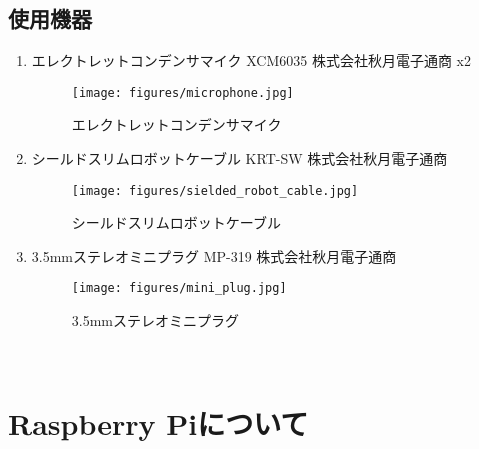 \subsection{使用機器}\label{used-equipments-mic}
  \begin{enumerate}
  \renewcommand{\labelenumi}{(\arabic{enumi})}
  \item
    エレクトレットコンデンサマイク XCM6035 株式会社秋月電子通商
    \cite{XCM6035:online} x2
    \begin{figure}[H]
      \centering
      \texttt{[image: figures/microphone.jpg]}
      \caption{エレクトレットコンデンサマイク}
      \label{fig:microphone}
    \end{figure}
  \item
    シールドスリムロボットケーブル KRT-SW 株式会社秋月電子通商
    \cite{sield_slim_robot_cable:online}
    \begin{figure}[H]
      \centering
      \texttt{[image: figures/sielded\_robot\_cable.jpg]}
      \caption{シールドスリムロボットケーブル}
      \label{fig:sield_slim_robot_cable}
    \end{figure}
  \item
    3.5mmステレオミニプラグ MP-319 株式会社秋月電子通商
    \begin{figure}[H]
      \centering
      \texttt{[image: figures/mini\_plug.jpg]}
      \caption{3.5mmステレオミニプラグ}
      \label{fig:mini_plug}
    \end{figure}
  \end{enumerate}

\
\section{Raspberry Piについて}\label{about-raspberry}


